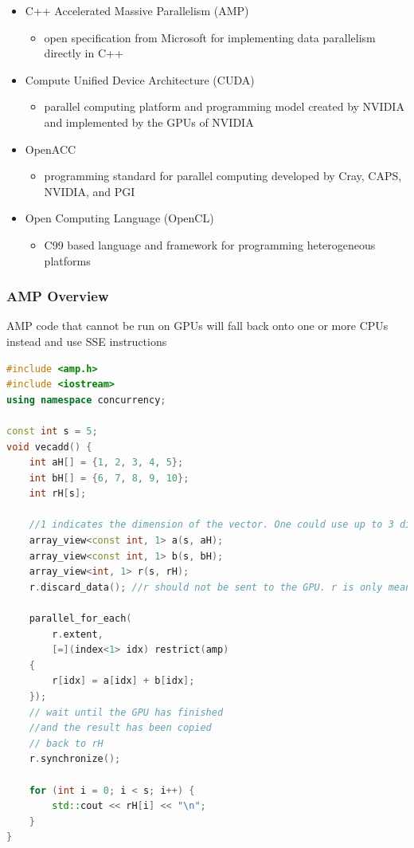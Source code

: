 \begin{itemize}
\tightlist
\item
  C++ Accelerated Massive Parallelism (AMP)

  \begin{itemize}
  \tightlist
  \item
    open specification from Microsoft for implementing data parallelism
    directly in C++
  \end{itemize}
\item
  Compute Unified Device Architecture (CUDA)

  \begin{itemize}
  \tightlist
  \item
    parallel computing platform and programming model created by NVIDIA
    and implemented by the GPUs of NVIDIA
  \end{itemize}
\item
  OpenACC

  \begin{itemize}
  \tightlist
  \item
    programming standard for parallel computing developed by Cray, CAPS,
    NVIDIA, and PGI
  \end{itemize}
\item
  Open Computing Language (OpenCL)

  \begin{itemize}
  \tightlist
  \item
    C99 based language and framework for programming heterogeneous
    platforms
  \end{itemize}
\end{itemize}

\clearpage
\hypertarget{amp-overview}{%
\subsubsection{AMP Overview}\label{amp-overview}}

AMP code that cannot be run on GPUs will fall back onto one or more CPUs
instead and use SSE instructions

\begin{lstlisting}[language=C++]
#include <amp.h>
#include <iostream>
using namespace concurrency;

const int s = 5;
void vecadd() {
    int aH[] = {1, 2, 3, 4, 5};
    int bH[] = {6, 7, 8, 9, 10};
    int rH[s];

    //1 indicates the dimension of the vector. One could use up to 3 dimensions for a vector.
    array_view<const int, 1> a(s, aH);
    array_view<const int, 1> b(s, bH);
    array_view<int, 1> r(s, rH);
    r.discard_data(); //r should not be sent to the GPU. r is only meant to be the result vector.

    parallel_for_each(
        r.extent,
        [=](index<1> idx) restrict(amp)
    {
        r[idx] = a[idx] + b[idx];
    });
    // wait until the GPU has finished
    //and the result has been copied
    // back to rH
    r.synchronize();

    for (int i = 0; i < s; i++) {
        std::cout << rH[i] << "\n";
    }
}
\end{lstlisting}


